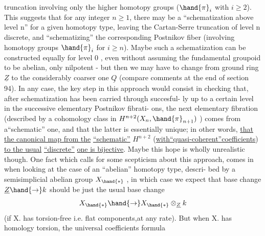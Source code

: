 
truncation involving only the higher homotopy groups ($\hand{\pi}_i$ with $i\geqslant 2$).
This suggests that for any integer $n\geqslant 1$, there may be a ``schematization
above level n'' for a given homotopy type, leaving the Cartan-Serre
truncation of  level n discrete, and ``schematizing'' the
corresponding  Postnikov fiber (involving homotopy groups $\hand{\pi}_i$ for $i\geqslant n$).
Maybe such a schematization can be constructed equally for level 0 ,
even without assuming the fundamental groupoid to be abelian, 
only nilpotent - but then we may have to change from ground ring $\underline{Z}$ to
the considerably coarser one $\underline{Q}$ (compare comments at the end of section
94). In any case, the key step in this approach would consist in 
checking that, after schematization has been carried through succesful-%
ly up to a certain level in the successive elementary Postnikov fibrati-%
ons, the next elementary fibration (described by a cohomology class in
$H^{n+2}(X_n,\hand{\pi}_{n+1})$ ) comes from a``schematic'' one, and that the latter is
essentially unique; in other words, \uline{that the canonical map from the}
\uline{``schematic''} $H^{n+2}$ (\uline{with``quasi-coherent''coefficients}) \uline{to the usual}
\uline{``discrete''} \uline{one is bijective}. Maybe this hope is wholly unrealistic\hand{\unsure{,}}
though. One fact which calls for some scepticism about this approach,
comes in when looking at the case of an ``abelian'' homotopy type, descri-%
bed by a semisimplicial abelian group $X_{\hand{\ast}}$ , in which case we expect that
base change $\underline{Z}\hand{\rightarrow} k$ should be just the usual base change
\[ X_{\hand{\ast}} \hand{\rightarrow} X_{\hand{\ast}}\otimes_{\underline{Z}} k \]
(if X. has torsion-free  i.e. flat components,at any rate).
But when X. has homology torsion, the universal coefficients formula
